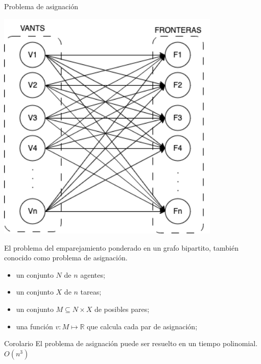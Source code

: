 \documentclass[
  24pt, %
  aspectratio=169, %
]{beamer}
\begin{document}
\begin{frame}{Problema de asignación}
  \begin{minipage}{0.48\textwidth}
    \includegraphics[width=0.8\textwidth]{asignacion}%
  \end{minipage}
  \begin{minipage}{0.51\textwidth}

    El problema del emparejamiento ponderado en un grafo bipartito, también conocido como problema de asignación.
    
    \begin{itemize}
    \item un conjunto $N$ de $n$ agentes;
    \item un conjunto $X$ de $n$ tareas;
    \item un conjunto $M \subseteq N \times X$ de posibles pares;
    \item una función $v : M \mapsto \mathbb{R}$ que calcula cada par de asignación;
    \end{itemize}
    \begin{block}{Corolario}
      El problema de asignación puede ser resuelto en un tiempo polinomial. $O(n^{3})$
    \end{block}
  \end{minipage}
\end{frame}
\end{document}
